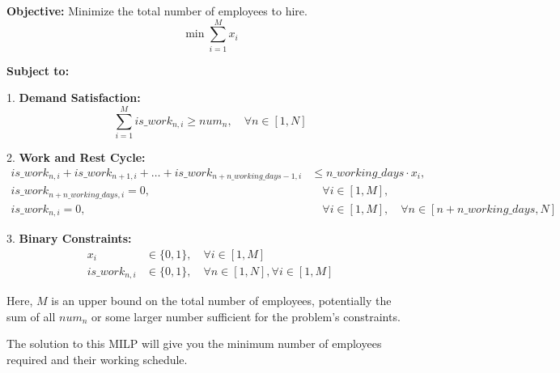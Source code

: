 \documentclass{article}
\begin{document}
\textbf{Objective:} Minimize the total number of employees to hire.
\begin{equation}
\min \sum_{i=1}^{M} x_i
\end{equation}

\textbf{Subject to:}

1. \textbf{Demand Satisfaction:}
\begin{equation}
\sum_{i=1}^{M} is\_work_{n,i} \geq num_n, \quad \forall n \in [1, N]
\end{equation}

2. \textbf{Work and Rest Cycle:} 
\begin{align}
is\_work_{n, i} + is\_work_{n+1, i} + \ldots + is\_work_{n + n\_working\_days - 1, i} & \leq n\_working\_days \cdot x_i, \\
is\_work_{n + n\_working\_days, i} = 0, & \quad \forall i \in [1, M], \\
is\_work_{n, i} = 0, & \quad \forall i \in [1, M], \quad \forall n \in [n + n\_working\_days, N]
\end{align}

3. \textbf{Binary Constraints:}
\begin{align}
x_i & \in \{0, 1\}, \quad \forall i \in [1, M] \\
is\_work_{n, i} & \in \{0, 1\}, \quad \forall n \in [1, N], \forall i \in [1, M]
\end{align}

Here, \( M \) is an upper bound on the total number of employees, potentially the sum of all \( num_n \) or some larger number sufficient for the problem's constraints.

The solution to this MILP will give you the minimum number of employees required and their working schedule.
\end{document}

